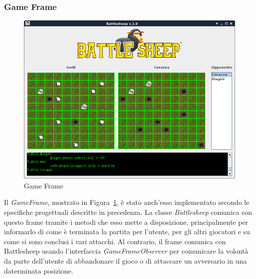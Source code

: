 \subsubsection{Game Frame}
\begin{figure}[!h]
	\centering
	\includegraphics[scale=0.4]{core/imgs/gui/game_frame}
	\caption{Game Frame}
	\label{figure:game_frame}
\end{figure}
Il \textit{GameFrame}, mostrato in Figura~\ref{figure:game_frame}, è stato anch'esso
 implementato secondo le specifiche progettuali descritte in precedenza.\newline
La classe \textit{Battlesheep} comunica con questo frame tramite i metodi che
esso mette a disposizione, principalmente per informarlo di come è terminata la
partita per l'utente, per gli altri giocatori e su come si sono conclusi i vari
attacchi. Al contrario, il frame comunica con Battlesheep usando l'interfaccia
\textit{GameFrameObserver} per comunicare la volontà da parte dell'utente di
abbandonare il gioco o di attaccare un avversario in una daterminata posizione.
